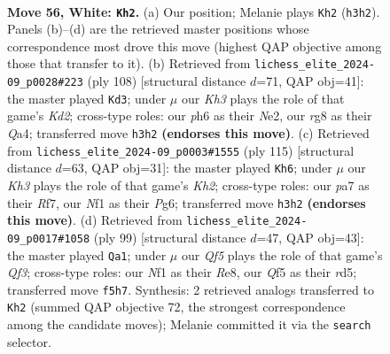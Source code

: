 \documentclass[11pt]{article}
\begin{document}
\clearpage

\begin{figure}[p]\centering
\begin{subfigure}{0.46\textwidth}\centering
\resizebox{\linewidth}{!}{%
\newchessgame
\chessboard[
  setfen={r5r1/p3q1p1/2k4p/3p1Q1P/p2P2P1/4P2K/8/4bN2 w - - 20 56},
  showmover=false,
  pgfstyle=straightmove, color=movearrow, markmove={h3-h2}
]}
\caption{}
\end{subfigure}\hfill
\begin{subfigure}{0.46\textwidth}\centering
\resizebox{\linewidth}{!}{%
\newchessgame
\chessboard[
  setfen={2r3k1/3R1p1p/4p1p1/2q1P1P1/Q4P1P/8/2PKN3/8 w - - 3 55},
  showmover=false,
  pgfstyle=straightmove, color=movearrow, markmove={d2-d3}
]}
\caption{}
\end{subfigure}
\\[4pt]
\begin{subfigure}{0.46\textwidth}\centering
\resizebox{\linewidth}{!}{%
\newchessgame
\chessboard[
  setfen={8/5r1k/3p2p1/2pP4/2P2q2/1P4pP/6P1/4Q1RK b - - 6 58},
  showmover=false,
  pgfstyle=straightmove, color=movearrow, markmove={h7-h6}
]}
\caption{}
\end{subfigure}\hfill
\begin{subfigure}{0.46\textwidth}\centering
\resizebox{\linewidth}{!}{%
\newchessgame
\chessboard[
  setfen={4r3/p5pk/5q1p/2PR1p2/1P2p2P/6P1/3Q1P1K/8 b - - 0 50},
  showmover=false,
  pgfstyle=straightmove, color=movearrow, markmove={f6-a1}
]}
\caption{}
\end{subfigure}
\caption{\textbf{Move 56, White: \texttt{Kh2}.} (a) Our position; Melanie plays \texttt{Kh2} (\texttt{h3h2}). Panels (b)--(d) are the retrieved master positions whose correspondence most drove this move (highest QAP objective among those that transfer to it). (b) Retrieved from \texttt{lichess\_elite\_2024-09\_p0028\#223} (ply 108) [structural distance $d$=71, QAP obj=41]: the master played \texttt{Kd3}; under $\mu$ our \emph{Kh3} plays the role of that game's \emph{Kd2}; cross-type roles: our \emph{p}h6 as their \emph{N}e2, our \emph{r}g8 as their \emph{Q}a4; transferred move \texttt{h3h2} \textbf{(endorses this move)}. (c) Retrieved from \texttt{lichess\_elite\_2024-09\_p0003\#1555} (ply 115) [structural distance $d$=63, QAP obj=31]: the master played \texttt{Kh6}; under $\mu$ our \emph{Kh3} plays the role of that game's \emph{Kh2}; cross-type roles: our \emph{p}a7 as their \emph{R}f7, our \emph{N}f1 as their \emph{P}g6; transferred move \texttt{h3h2} \textbf{(endorses this move)}. (d) Retrieved from \texttt{lichess\_elite\_2024-09\_p0017\#1058} (ply 99) [structural distance $d$=47, QAP obj=43]: the master played \texttt{Qa1}; under $\mu$ our \emph{Qf5} plays the role of that game's \emph{Qf3}; cross-type roles: our \emph{N}f1 as their \emph{R}e8, our \emph{Q}f5 as their \emph{r}d5; transferred move \texttt{f5h7}. Synthesis: 2 retrieved analogs transferred to \texttt{Kh2} (summed QAP objective 72, the strongest correspondence among the candidate moves); Melanie committed it via the \texttt{search} selector.}
\label{fig:thought-m110}
\end{figure}
\end{document}
